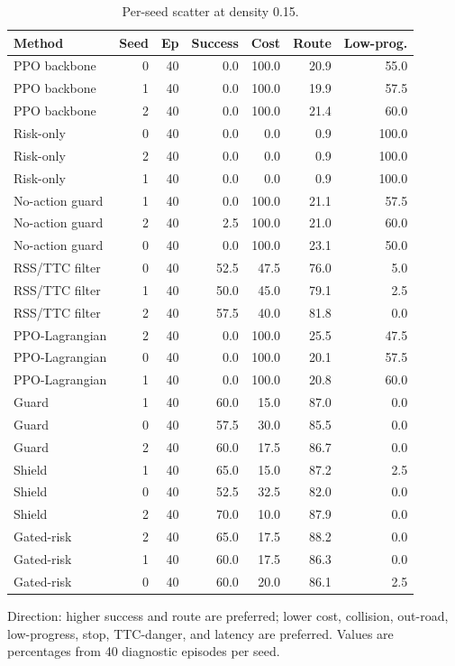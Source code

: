 \begin{table}[!htbp]
\centering
\caption{Per-seed scatter at density 0.15.}
\label{tab_seed_scatter}
\footnotesize
\setlength{\tabcolsep}{3.0pt}
\renewcommand{\arraystretch}{1.08}
\begin{tabular}{@{}lrrrrrr@{}}
\toprule
Method & Seed & Ep & Success & Cost & Route & Low-prog. \\
\midrule
PPO backbone & 0 & 40 & 0.0 & 100.0 & 20.9 & 55.0 \\
PPO backbone & 1 & 40 & 0.0 & 100.0 & 19.9 & 57.5 \\
PPO backbone & 2 & 40 & 0.0 & 100.0 & 21.4 & 60.0 \\
Risk-only & 0 & 40 & 0.0 & 0.0 & 0.9 & 100.0 \\
Risk-only & 2 & 40 & 0.0 & 0.0 & 0.9 & 100.0 \\
Risk-only & 1 & 40 & 0.0 & 0.0 & 0.9 & 100.0 \\
No-action guard & 1 & 40 & 0.0 & 100.0 & 21.1 & 57.5 \\
No-action guard & 2 & 40 & 2.5 & 100.0 & 21.0 & 60.0 \\
No-action guard & 0 & 40 & 0.0 & 100.0 & 23.1 & 50.0 \\
RSS/TTC filter & 0 & 40 & 52.5 & 47.5 & 76.0 & 5.0 \\
RSS/TTC filter & 1 & 40 & 50.0 & 45.0 & 79.1 & 2.5 \\
RSS/TTC filter & 2 & 40 & 57.5 & 40.0 & 81.8 & 0.0 \\
PPO-Lagrangian & 2 & 40 & 0.0 & 100.0 & 25.5 & 47.5 \\
PPO-Lagrangian & 0 & 40 & 0.0 & 100.0 & 20.1 & 57.5 \\
PPO-Lagrangian & 1 & 40 & 0.0 & 100.0 & 20.8 & 60.0 \\
Guard & 1 & 40 & 60.0 & 15.0 & 87.0 & 0.0 \\
Guard & 0 & 40 & 57.5 & 30.0 & 85.5 & 0.0 \\
Guard & 2 & 40 & 60.0 & 17.5 & 86.7 & 0.0 \\
Shield & 1 & 40 & 65.0 & 15.0 & 87.2 & 2.5 \\
Shield & 0 & 40 & 52.5 & 32.5 & 82.0 & 0.0 \\
Shield & 2 & 40 & 70.0 & 10.0 & 87.9 & 0.0 \\
Gated-risk & 2 & 40 & 65.0 & 17.5 & 88.2 & 0.0 \\
Gated-risk & 1 & 40 & 60.0 & 17.5 & 86.3 & 0.0 \\
Gated-risk & 0 & 40 & 60.0 & 20.0 & 86.1 & 2.5 \\
\bottomrule
\end{tabular}
\begin{tablenotes}
\item Direction: higher success and route are preferred; lower cost, collision, out-road, low-progress, stop, TTC-danger, and latency are preferred. Values are percentages from 40 diagnostic episodes per seed.
\end{tablenotes}
\end{table}
